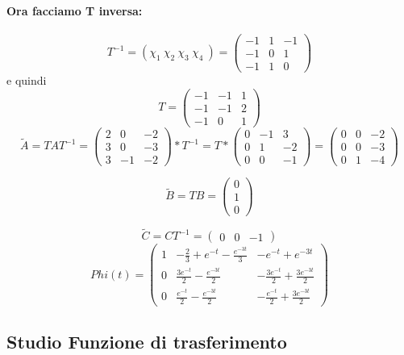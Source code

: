 \documentclass{article}
\begin{document}
\paragraph{Ora facciamo T inversa:} \[ T^{-1} = (\chi_1\ \chi_2\ \chi_3\ \chi_4\ ) = \left(\begin{matrix}-1 & 1 & -1\\-1 & 0 & 1\\-1 & 1 & 0\end{matrix}\right) \]
e quindi \[T = \left(\begin{matrix}-1 & -1 & 1\\-1 & -1 & 2\\-1 & 0 & 1\end{matrix}\right)\]
\[ \widetilde{A} = TAT^{-1} = \left(\begin{matrix}2 & 0 & -2\\3 & 0 & -3\\3 & -1 & -2\end{matrix}\right) * T^{-1} = T*\left(\begin{matrix}0 & -1 & 3\\0 & 1 & -2\\0 & 0 & -1\end{matrix}\right) =\left(\begin{matrix}0 & 0 & -2\\0 & 0 & -3\\0 & 1 & -4\end{matrix}\right) \]

\[ \widetilde{B} = T B = \left(\begin{matrix}0\\1\\0\end{matrix}\right) \]

\[ \widetilde{C} = C T^{-1} = \left(\begin{matrix}0 & 0 & -1\end{matrix}\right) \]
\[Phi(t) = \left(\begin{matrix}1 & - \frac{2}{3} + e^{- t} - \frac{e^{- 3 t}}{3} & - e^{- t} + e^{- 3 t}\\0 & \frac{3 e^{- t}}{2} - \frac{e^{- 3 t}}{2} & - \frac{3 e^{- t}}{2} + \frac{3 e^{- 3 t}}{2}\\0 & \frac{e^{- t}}{2} - \frac{e^{- 3 t}}{2} & - \frac{e^{- t}}{2} + \frac{3 e^{- 3 t}}{2}\end{matrix}\right) \]

\subsection{Studio Funzione di trasferimento}
\end{document}
